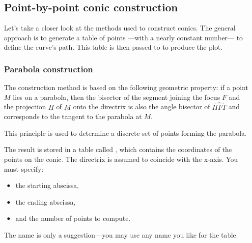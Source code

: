 

\subsection{Point-by-point conic construction} %
\label{sub:point_by_point_conic_construction}

Let’s take a closer look at the methods used to construct conics. The general approach is to generate a table of points ---with a nearly constant number--- to define the curve’s path. This table is then passed to \TIKZ{} to produce the plot.

\subsubsection{Parabola construction} %
\label{ssub:parabola_construction}

The construction method is based on the following geometric property: if a point $M$ lies on a parabola, then the bisector of the segment joining the focus $F$ and the projection $H$ of $M$ onto the directrix is also the angle bisector of $\widehat{HFT}$ and corresponds to the tangent to the parabola at $M$.

This principle is used to determine a discrete set of points forming the parabola.

The result is stored in a table called , which contains the coordinates of the points on the conic. The directrix is assumed to coincide with the x-axis. You must specify:
\begin{itemize}
  \item the starting abscissa,
  \item the ending abscissa,
  \item and the number of points to compute.
\end{itemize}

The name  is only a suggestion—you may use any name you like for the table.


\vspace{1em}

